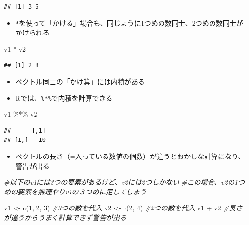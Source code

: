 \documentclass[
]{book}
\newenvironment{Shaded}{\begin{snugshade}}{\end{snugshade}}
\newcommand{\CommentTok}[1]{\textcolor[rgb]{0.56,0.35,0.01}{\textit{#1}}}
\newcommand{\DecValTok}[1]{\textcolor[rgb]{0.00,0.00,0.81}{#1}}
\newcommand{\FunctionTok}[1]{\textcolor[rgb]{0.00,0.00,0.00}{#1}}
\newcommand{\NormalTok}[1]{#1}
\newcommand{\OtherTok}[1]{\textcolor[rgb]{0.56,0.35,0.01}{#1}}
\newcommand{\SpecialCharTok}[1]{\textcolor[rgb]{0.00,0.00,0.00}{#1}}
\providecommand{\tightlist}{%
  \setlength{\itemsep}{0pt}\setlength{\parskip}{0pt}}
\begin{document}
\begin{verbatim}
## [1] 3 6
\end{verbatim}

\begin{itemize}
\tightlist
\item
  \texttt{*}を使って「かける」場合も、同じように1つめの数同士、2つめの数同士がかけられる
\end{itemize}

\begin{Shaded}
\begin{Highlighting}[]
\NormalTok{v1 }\SpecialCharTok{*}\NormalTok{ v2}
\end{Highlighting}
\end{Shaded}

\begin{verbatim}
## [1] 2 8
\end{verbatim}

\begin{itemize}
\tightlist
\item
  ベクトル同士の「かけ算」には内積がある
\item
  Rでは、\texttt{\%*\%}で内積を計算できる
\end{itemize}

\begin{Shaded}
\begin{Highlighting}[]
\NormalTok{v1 }\SpecialCharTok{\%*\%}\NormalTok{ v2 }
\end{Highlighting}
\end{Shaded}

\begin{verbatim}
##      [,1]
## [1,]   10
\end{verbatim}

\begin{itemize}
\tightlist
\item
  ベクトルの長さ（=入っている数値の個数）が違うとおかしな計算になり、警告が出る
\end{itemize}

\begin{Shaded}
\begin{Highlighting}[]
\CommentTok{\#以下のv1には3つの要素があるけど、v2には2つしかない}
\CommentTok{\#この場合、v2の1つめの要素を無理やりv1の３つめに足してしまう}

\NormalTok{v1 }\OtherTok{\textless{}{-}} \FunctionTok{c}\NormalTok{(}\DecValTok{1}\NormalTok{, }\DecValTok{2}\NormalTok{, }\DecValTok{3}\NormalTok{)  }\CommentTok{\#3つの数を代入}
\NormalTok{v2 }\OtherTok{\textless{}{-}} \FunctionTok{c}\NormalTok{(}\DecValTok{2}\NormalTok{, }\DecValTok{4}\NormalTok{) }\CommentTok{\#2つの数を代入}
\NormalTok{v1 }\SpecialCharTok{+}\NormalTok{ v2 }\CommentTok{\#長さが違うからうまく計算できず警告が出る}
\end{Highlighting}
\end{Shaded}
\end{document}
